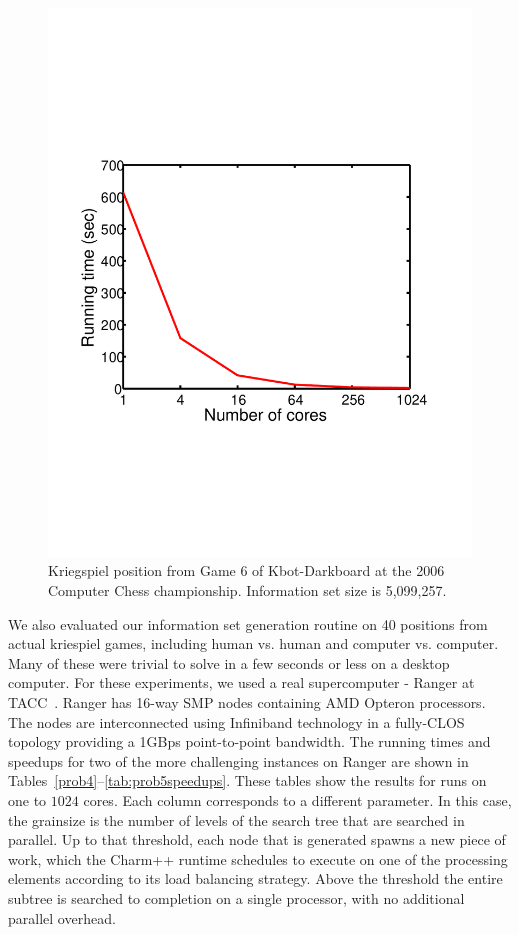 \documentclass[times, 10pt,twocolumn]{article}
\begin{document}
\begin{figure}[ht]
 \centering \includegraphics[viewport= 280 200 300 550, scale=0.35]{images/KriegspielProblem5.pdf} %
\caption{Kriegspiel position from Game 6 of Kbot-Darkboard at the 2006 Computer Chess championship.  Information set size is 5,099,257.}
\label{prob5} 
\vspace{-0.2in}
\end{figure}


We also evaluated our information set generation routine on 40 positions from actual kriespiel games, including human vs. human and computer vs. computer.  Many of these were trivial to solve in a few seconds or less on a desktop computer.  For these experiments, we used a real supercomputer - Ranger at TACC~\cite{ranger}. Ranger has 16-way SMP nodes containing AMD Opteron processors. The nodes are interconnected using Infiniband technology in a fully-CLOS topology providing a 1GBps point-to-point bandwidth. The running times and speedups for two of the more challenging instances on Ranger are shown in Tables~\ref{prob4}--\ref{tab:prob5speedups}.   These tables show the results for runs on one to $1024$ cores.  Each column corresponds to a different parameter.  In this case, the grainsize is the number of levels of the search tree that are searched in parallel.  Up to that threshold, each node that is generated spawns a new piece of work, which the {\sc Charm++} runtime schedules to execute on one of the processing elements according to its load balancing strategy.  Above the threshold the entire subtree is searched to completion on a single processor, with no additional parallel overhead. 
\end{document}
